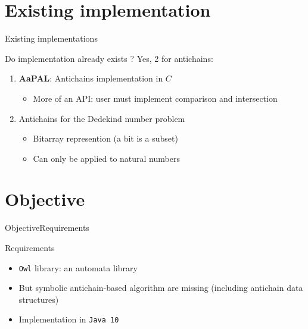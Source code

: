 \documentclass[11pt]{beamer}
\begin{document}
\section{Existing implementation}

\begin{frame}{Existing implementations}
    \begin{block}{Do implementation already exists ?}
        Yes, 2 for antichains:
        \begin{enumerate}
            \item \textbf{AaPAL}: Antichains implementation in $C$
            \begin{itemize}
                \item More of an API: user must implement
                comparison and intersection
            \end{itemize}
            \item Antichains for the Dedekind number problem
            \begin{itemize}
                \item Bitarray represention (a bit is a subset)
                \item Can only be applied to natural numbers
            \end{itemize}

        \end{enumerate}
    \end{block}
\end{frame}

\section{Objective}

\begin{frame}{Objective}{Requirements}
    \begin{block}{Requirements}
        \begin{itemize}
            \item \texttt{Owl} library: an automata library
            \item But symbolic antichain-based algorithm are missing
            (including antichain data structures)
            \item Implementation in \texttt{Java 10}
        \end{itemize}

    \end{block}
\end{frame}
\end{document}

